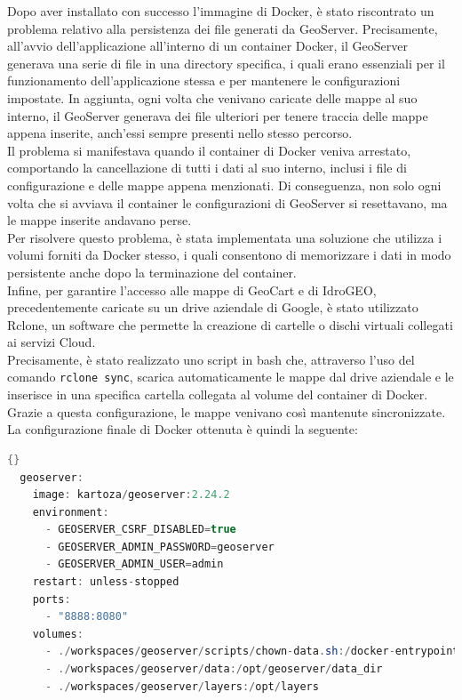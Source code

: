 Dopo aver installato con successo l'immagine di Docker, è stato riscontrato un problema relativo alla persistenza dei file generati da GeoServer. Precisamente, all'avvio dell'applicazione all'interno di un container Docker, il GeoServer generava una serie di file in una directory specifica, i quali erano essenziali per il funzionamento dell'applicazione stessa e per mantenere le configurazioni impostate. In aggiunta, ogni volta che venivano caricate delle mappe al suo interno, il GeoServer generava dei file ulteriori per tenere traccia delle mappe appena inserite, anch'essi sempre presenti nello stesso percorso.
\\Il problema si manifestava quando il container di Docker veniva arrestato, comportando la cancellazione di tutti i dati al suo interno, inclusi i file di configurazione e delle mappe appena menzionati. Di conseguenza, non solo ogni volta che si avviava il container le configurazioni di GeoServer si resettavano, ma le mappe inserite andavano perse.
\\Per risolvere questo problema, è stata implementata una soluzione che utilizza i volumi forniti da Docker stesso, i quali consentono di memorizzare i dati in modo persistente anche dopo la terminazione del container.
\\Infine, per garantire l'accesso alle mappe di GeoCart e di IdroGEO, precedentemente caricate su un drive aziendale di Google, è stato utilizzato Rclone, un software che permette la creazione di cartelle o dischi virtuali collegati ai servizi Cloud. 
\\Precisamente, è stato realizzato uno script in bash che, attraverso l'uso del comando \verb|rclone sync|, scarica automaticamente le mappe dal drive aziendale e le inserisce in una specifica cartella collegata al volume del container di Docker. Grazie a questa configurazione, le mappe venivano così mantenute sincronizzate. La configurazione finale di Docker ottenuta è quindi la seguente:

\begin{lstlisting}[language=Java]{}
  geoserver:
    image: kartoza/geoserver:2.24.2
    environment:
      - GEOSERVER_CSRF_DISABLED=true
      - GEOSERVER_ADMIN_PASSWORD=geoserver
      - GEOSERVER_ADMIN_USER=admin
    restart: unless-stopped
    ports:
      - "8888:8080"
    volumes:
      - ./workspaces/geoserver/scripts/chown-data.sh:/docker-entrypoint-geoserver.d/chown-data.sh
      - ./workspaces/geoserver/data:/opt/geoserver/data_dir
      - ./workspaces/geoserver/layers:/opt/layers
\end{lstlisting}

